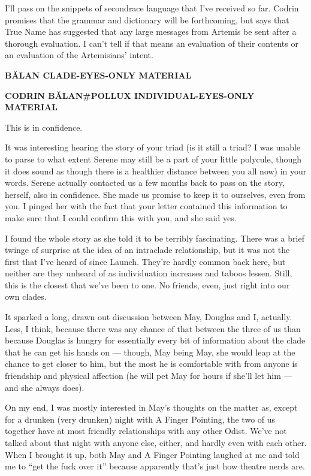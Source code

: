 I'll pass on the snippets of secondrace language that I've received so far. Codrin promises that the grammar and dictionary will be forthcoming, but says that True Name has suggested that any large messages from Artemis be sent after a thorough evaluation. I can't tell if that means an evaluation of their contents or an evaluation of the Artemisians' intent.

\begin{center}
\textbf{BĂLAN CLADE-EYES-ONLY MATERIAL}
\end{center}

\begin{center}
\textbf{CODRIN BĂLAN\#POLLUX INDIVIDUAL-EYES-ONLY MATERIAL}
\end{center}

This is in confidence.

It was interesting hearing the story of your triad (is it still a triad? I was unable to parse to what extent Serene may still be a part of your little polycule, though it does sound as though there is a healthier distance between you all now) in your words. Serene actually contacted us a few months back to pass on the story, herself, also in confidence. She made us promise to keep it to ourselves, even from you. I pinged her with the fact that your letter contained this information to make sure that I could confirm this with you, and she said yes.

I found the whole story as she told it to be terribly fascinating. There was a brief twinge of surprise at the idea of an intraclade relationship, but it was not the first that I've heard of since Launch. They're hardly common back here, but neither are they unheard of as individuation increases and taboos lessen. Still, this is the closest that we've been to one. No friends, even, just right into our own clades.

It sparked a long, drawn out discussion between May, Douglas and I, actually. Less, I think, because there was any chance of that between the three of us than because Douglas is hungry for essentially every bit of information about the clade that he can get his hands on — though, May being May, she would leap at the chance to get closer to him, but the most he is comfortable with from anyone is friendship and physical affection (he will pet May for hours if she'll let him — and she always does).

On my end, I was mostly interested in May's thoughts on the matter as, except for a drunken (very drunken) night with A Finger Pointing, the two of us together have at most friendly relationships with any other Odist. We've not talked about that night with anyone else, either, and hardly even with each other. When I brought it up, both May and A Finger Pointing laughed at me and told me to ``get the fuck over it'' because apparently that's just how theatre nerds are.

